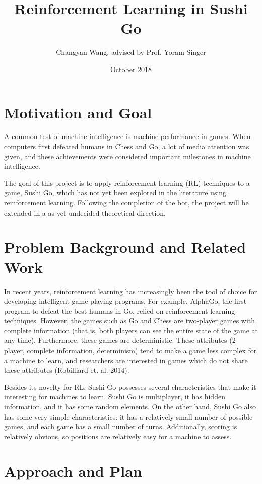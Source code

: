 \documentclass{article}
\title{Reinforcement Learning in Sushi Go}
\author{Changyan Wang, advised by Prof. Yoram Singer}
\date{October 2018}
\begin{document}
\maketitle
\thispagestyle{empty}
\doublespacing
\section{Motivation and Goal}

A common test of machine intelligence is machine performance in games. When computers first defeated humans in Chess and Go, a lot of media attention was given, and these achievements were considered important milestones in machine intelligence.

The goal of this project is to apply reinforcement learning (RL) techniques to a game, Sushi Go, which has not yet been explored in the literature using reinforcement learning. Following the completion of the bot, the project will be extended in a as-yet-undecided theoretical direction.

\section{Problem Background and Related Work}

In recent years, reinforcement learning has increasingly been the tool of choice for developing intelligent game-playing programs. For example, AlphaGo, the first program to defeat the best humans in Go, relied on reinforcement learning techniques. However, the games such as Go and Chess are two-player games with complete information (that is, both players can see the entire state of the game at any time). Furthermore, these games are deterministic. These attributes (2-player, complete information, determinism) tend to make a game less complex for a machine to learn, and researchers are interested in games which do not share these attributes (Robilliard et. al. 2014).

Besides its novelty for RL, Sushi Go possesses several characteristics that make it interesting for machines to learn. Sushi Go is multiplayer, it has hidden information, and it has some random elements. On the other hand, Sushi Go also has some very simple characteristics: it has a relatively small number of possible games, and each game has a small number of turns. Additionally, scoring is relatively obvious, so positions are relatively easy for a machine to assess.

\section{Approach and Plan}
\end{document}
